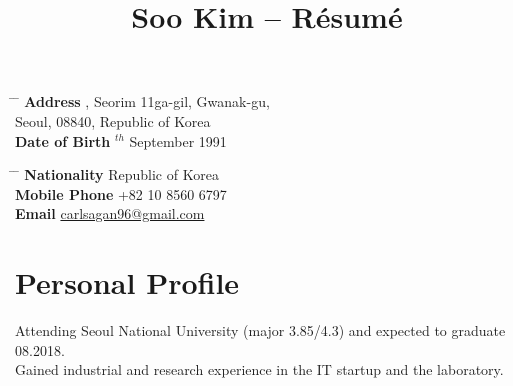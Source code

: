 \documentclass[10pt]{article} %
\begin{document}

\title{Soo Kim -- Résumé} %


\parbox[c][3em][c]{0.5\textwidth}{ %
\begin{tabbing} %
\hspace{3cm} \= \hspace{4cm} \= \kill %
\textbf{Address} , Seorim 11ga-gil, Gwanak-gu,\\ %
\> Seoul, 08840, Republic of Korea\\ %
\textbf{Date of Birth} $^{th}$ September 1991\\ %
\end{tabbing}
}
\hfill %
\parbox[c][3em][c]{0.5\textwidth}{ %
\begin{tabbing} %
\hspace{3cm} \= \hspace{4cm} \= \kill %
\textbf{Nationality} \> Republic of Korea\\ %
\textbf{Mobile Phone} \> +82 10 8560 6797\\ %
\textbf{Email} \> \href{mailto:carlsagan96@gmail.com}{carlsagan96@gmail.com}\\ %
\end{tabbing}}


\section{Personal Profile}

Attending Seoul National University (major 3.85/4.3) and expected to graduate 08.2018.\\
Gained industrial and research experience in the IT startup and the laboratory.

\end{document}
